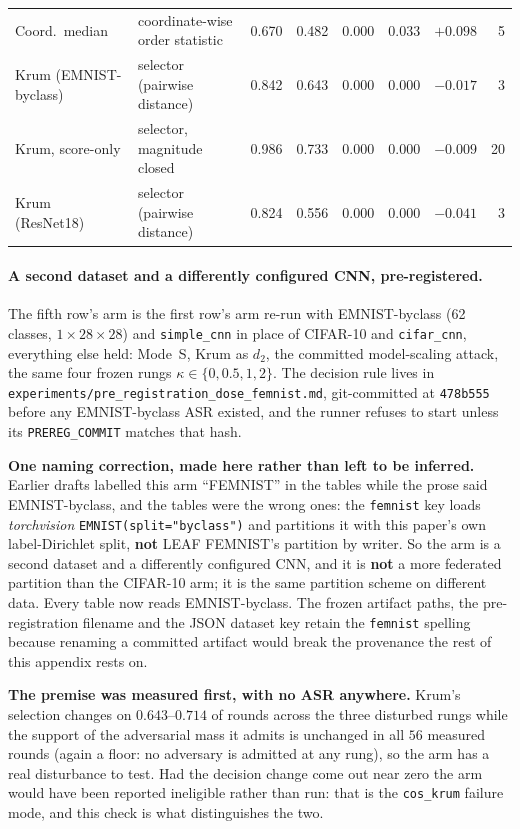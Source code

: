 \documentclass{article}
\begin{document}
\begin{table}[h]
\begin{tabular}{@{}llrrrrrr@{}}
Coord.\ median & coordinate-wise order statistic & 0.670 & 0.482 & 0.000 & 0.033 & $+0.098$ & 5 \\
Krum (EMNIST-byclass) & selector (pairwise distance) & 0.842 & 0.643 & 0.000 & 0.000 & $-0.017$ & 3 \\
Krum, score-only & selector, magnitude closed & 0.986 & 0.733 & 0.000 & 0.000 & $-0.009$ & 20 \\
Krum (ResNet18) & selector (pairwise distance) & 0.824 & 0.556 & 0.000 & 0.000 & $-0.041$ & 3 \\
\bottomrule
\end{tabular}
\end{table}

\paragraph{A second dataset and a differently configured CNN, pre-registered.} The fifth row's arm is the first row's arm re-run with EMNIST-byclass (62 classes, $1{\times}28{\times}28$) and \texttt{simple\_cnn} in place of CIFAR-10 and \texttt{cifar\_cnn}, everything else held: Mode~S, Krum as $d_2$, the committed model-scaling attack, the same four frozen rungs $\kappa \in \{0,0.5,1,2\}$. The decision rule lives in \texttt{experiments/\allowbreak pre\_registration\_dose\_femnist.md}, git-committed at \texttt{478b555} before any EMNIST-byclass ASR existed, and the runner refuses to start unless its \texttt{PREREG\_COMMIT} matches that hash.

\textbf{One naming correction, made here rather than left to be inferred.} Earlier drafts labelled this arm ``FEMNIST'' in the tables while the prose said EMNIST-byclass, and the tables were the wrong ones: the \texttt{femnist} key loads \emph{torchvision} \texttt{EMNIST(split="byclass")} and partitions it with this paper's own label-Dirichlet split, \textbf{not} LEAF FEMNIST's partition by writer. So the arm is a second dataset and a differently configured CNN, and it is \textbf{not} a more federated partition than the CIFAR-10 arm; it is the same partition scheme on different data. Every table now reads EMNIST-byclass. The frozen artifact paths, the pre-registration filename and the JSON dataset key retain the \texttt{femnist} spelling because renaming a committed artifact would break the provenance the rest of this appendix rests on.

\textbf{The premise was measured first, with no ASR anywhere.} Krum's selection changes on $0.643$--$0.714$ of rounds across the three disturbed rungs while the support of the adversarial mass it admits is unchanged in all $56$ measured rounds (again a floor: no adversary is admitted at any rung), so the arm has a real disturbance to test. Had the decision change come out near zero the arm would have been reported ineligible rather than run: that is the \texttt{cos\_krum} failure mode, and this check is what distinguishes the two.
\end{document}
